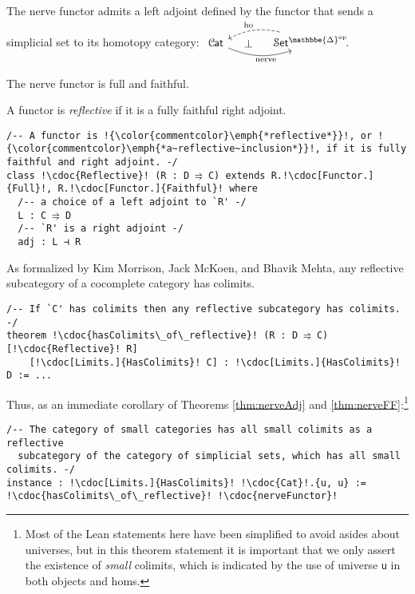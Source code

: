 \documentclass[a4paper,UKenglish,cleveref, autoref, thm-restate]{lipics-v2021}
\newcommand{\op}{\textup{op}}
\newcommand{\ho}{\textup{ho}}
\newcommand{\nerve}{\textup{nerve}}
\newcommand{\cat}[1]{\textup{\textsf{#1}}}%
\newcommand{\1}{\mathbbe{1}}
\newcommand{\2}{\mathbbe{2}}
\newcommand{\3}{\mathbbe{3}}
\newcommand{\DDelta}{\mathbbe{\Delta}}
\newcommand{\Cat}{\mathcal{C}{\kern-.75pt}\cat{at}}
\newcommand{\Set}{\mathcal{S}\cat{et}}
\newcommand{\cdoc}[2][]{\href{https://leanprover-community.github.io/mathlib4_docs/find/?pattern=CategoryTheory.#1#2\#doc}{\texttt{#2}}}
\begin{document}
\begin{theorem}[\cdoc{nerveAdjunction}]\label{thm:nerveAdj} The nerve functor admits a left adjoint defined by the functor that sends a simplicial set to its homotopy category:
$ \begin{tikzcd}[column sep=large] \Cat \arrow[r, bend right=20, "{\nerve}"' pos=.6] \arrow[r, phantom, "\bot"] & \Set^{\DDelta^\op}\!. \arrow[l, bend right=20, dashed, "{\ho}"' pos=.45]
\end{tikzcd}$
\end{theorem}

\begin{theorem}[\cdoc{nerveFunctor.fullyfaithful}]\label{thm:nerveFF} The nerve functor is full and faithful.
\end{theorem}

A functor is \emph{reflective} if it is a fully faithful right adjoint.
\begin{lstlisting}
/-- A functor is !{\color{commentcolor}\emph{*reflective*}}!, or !{\color{commentcolor}\emph{*a~reflective~inclusion*}}!, if it is fully faithful and right adjoint. -/
class !\cdoc{Reflective}! (R : D ⥤ C) extends R.!\cdoc[Functor.]{Full}!, R.!\cdoc[Functor.]{Faithful}! where
  /-- a choice of a left adjoint to `R' -/
  L : C ⥤ D
  /-- `R' is a right adjoint -/
  adj : L ⊣ R
\end{lstlisting}
As formalized by Kim Morrison, Jack McKoen, and Bhavik Mehta, any reflective subcategory of a cocomplete category has colimits.

\begin{lstlisting}
/-- If `C' has colimits then any reflective subcategory has colimits. -/
theorem !\cdoc{hasColimits\_of\_reflective}! (R : D ⥤ C) [!\cdoc{Reflective}! R]
    [!\cdoc[Limits.]{HasColimits}! C] : !\cdoc[Limits.]{HasColimits}! D := ...
\end{lstlisting}

Thus, as an immediate corollary of Theorems \ref{thm:nerveAdj} and \ref{thm:nerveFF}:\footnote{Most of the Lean statements here have been simplified to avoid asides about universes, but in this theorem statement it is important that we only assert the existence of \emph{small} colimits, which is indicated by the use of universe \lstinline|u| in both objects and homs.}
\begin{lstlisting}
/-- The category of small categories has all small colimits as a reflective
  subcategory of the category of simplicial sets, which has all small colimits. -/
instance : !\cdoc[Limits.]{HasColimits}! !\cdoc{Cat}!.{u, u} := !\cdoc{hasColimits\_of\_reflective}! !\cdoc{nerveFunctor}!
\end{lstlisting}
\end{document}
